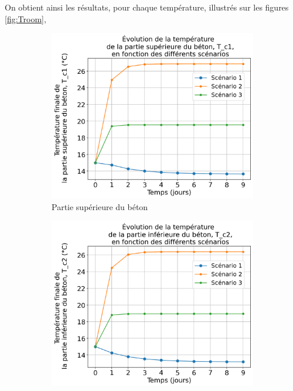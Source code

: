 \documentclass[12pt]{article}
\begin{document}
        On obtient ainsi les résultats, pour chaque température, illustrés sur les figures \ref{fig:Troom},
        \begin{figure}
            \centering
            
            \begin{subfigure}{0.48\textwidth}
                \centering
                \includegraphics[width=1\linewidth]{Rapport/figures/T_c1.png}
                \caption{Partie supérieure du béton} 
                \label{fig:Tc1}
            \end{subfigure}
            \hfill
            \begin{subfigure}{0.48\textwidth}
                \centering
                \includegraphics[width=1\linewidth]{Rapport/figures/T_c2.png}

\end{subfigure}
\end{figure}
\end{document}
